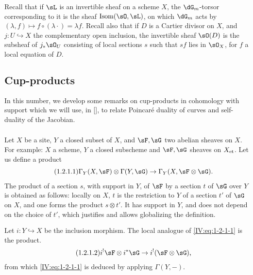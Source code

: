 \subsubsection{}\label{IV:1-1-6}

Recall that if $\sL$ is an invertible sheaf on a scheme $X$, the
$\dG_m$-torsor corresponding to it is the sheaf $\operatorname{Isom}(\sO,\sL)$,
on which $\dG_m$ acts by
$(\lambda,f)\mapsto f\circ (\lambda\cdot) = \lambda f$. Recall also that
if $D$ is a Cartier divisor on $X$, and $j:U\hookrightarrow X$
the complementary open inclusion, the invertible sheaf $\sO(D)$ is the
subsheaf of $j_*\sO_U$ consisting of local sections $s$ such that $s f$
lies in $\sO_X$, for $f$ a local equation of $D$.










\subsection{Cup-products}\label{IV:1-2}

In this number, we develop some remarks on cup-products in
cohomology with support which we will use, in [], to relate
Poincar\'e duality of curves and self-duality of the Jacobian.

\subsubsection{}\label{IV:1-2-1}

Let $X$ be a site, $Y$ a closed subset of $X$, and $\sF,\sG$ two abelian
sheaves on $X$. For example: $X$ a scheme, $Y$ a closed subscheme
and $\sF,\sG$ sheaves on ${X}_{\textnormal{et}}$. Let us define a product
\begin{equation*}\tag{1.2.1.1}\label{IV:eq:1-2-1-1}
  \Gamma_Y(X,\sF)\otimes \Gamma(Y,\sG) \to \Gamma_Y(X,\sF\otimes\sG) \text{.}
\end{equation*}
The product of a section $s$, with support in $Y$, of $\sF$ by a section
$t$ of $\sG$ over $Y$ is obtained as follows: locally on $X$, $t$ is the
restriction to $Y$ of a section $t'$ of $\sG$ on $X$, and one forms the product
$s\otimes t'$. It has support in $Y$, and does not depend on the choice of
$t'$, which justifies and allows globalizing the definition.

Let $i:Y\hookrightarrow X$ be the inclusion morphism. The local analogue of
\eqref{IV:eq:1-2-1-1} is the product.
\begin{equation*}\tag{1.2.1.2}\label{IV:eq:1-2-1-2}
  i^!\sF\otimes i^*\sG \to i^!(\sF\otimes\sG) \text{,}
\end{equation*}
from which \eqref{IV:eq:1-2-1-1} is deduced by applying $\Gamma(Y,-)$.




